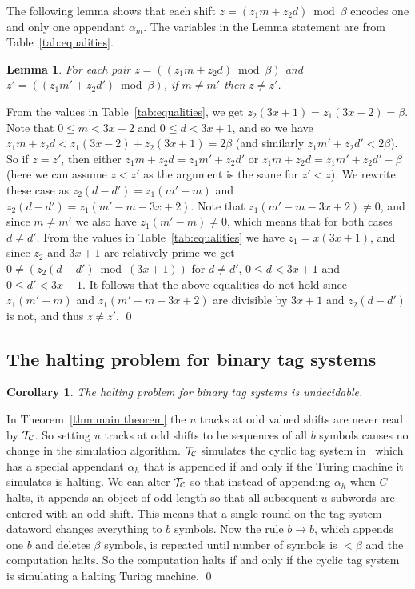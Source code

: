 \documentclass[11pt]{article} \usepackage{amsfonts,amsmath,amssymb,amsthm}
\renewenvironment{proof}{{\bfseries\noindent Proof.}}{\qed\vspace{3.5ex}}
\newtheorem{lemma}{Lemma}
\newtheorem{corollary}{Corollary}
\begin{document}
The following lemma shows that each shift $z=(z_1m+z_2d)\bmod\beta$ encodes one and only one appendant $\alpha_{m}$.
The variables in the Lemma statement are from Table~\ref{tab:equalities}.
\begin{lemma}\label{lem:Encode appendant}
For each pair $z=((z_1m+z_2d)\bmod\beta)$ and $z'=((z_1m'+z_2d')\bmod\beta)$, if $m\neq m'$ then $z\neq z'$.
\end{lemma}
\begin{proof}
From the values in Table~\ref{tab:equalities}, we get $z_2(3x+1)=z_1(3x-2)=\beta$. 
Note that $0\leqslant m< 3x-2$ and $0\leqslant d< 3x+1$,  and so we have $z_1m+z_2d<z_1(3x-2)+z_2(3x+1)=2\beta$ (and similarly  $z_1m'+z_2d'<2\beta$). 
So if $z=z'$, then either $z_1m+z_2d=z_1m'+z_2d'$ or $z_1m+z_2d=z_1m'+z_2d'-\beta$ (here we can assume $z<z'$ as the argument is the same for $z'<z$).
We rewrite these case as $z_2(d-d')=z_1(m'-m)$ and $z_2(d-d')=z_1(m'-m-3x+2)$. 
Note that $z_1(m'-m-3x+2)\neq 0$, and since $m\neq m'$ we also have $z_1(m'-m)\neq 0$, which means that for both cases $d\neq d'$. 
From the values in Table~\ref{tab:equalities} we have $z_1=x(3x+1)$, and since $z_2$ and $3x+1$ are relatively prime we get $0\neq (z_2(d-d')\bmod (3x+1))$ for $d\neq d'$, $0\leqslant d< 3x+1$ and $0\leqslant d'< 3x+1$. It follows that the above equalities do not hold since $z_1(m'-m)$ and $z_1(m'-m-3x+2)$ are divisible by $3x+1$ and $z_2(d-d')$ is not, and thus $z\neq z'$.
\end{proof}


\subsection{The halting problem for binary tag systems}

\begin{corollary}\label{cor:2 symbol tag halting problem}
The halting problem for binary tag systems is undecidable.
\end{corollary}
\begin{proof}
In Theorem~\ref{thm:main theorem} the $u$ tracks at odd valued shifts are never read by $\mathcal{T_{\mathcal{C}}}$. So setting $u$ tracks at odd shifts to be sequences of all $b$ symbols causes no change in the simulation algorithm. $\mathcal{T_{\mathcal{C}}}$ simulates the cyclic tag system in~\cite{NearyWoods2006C} which has a special appendant $\alpha_h$ that is appended if and only if the Turing machine it simulates is halting. 
We can alter $\mathcal{T_{\mathcal{C}}}$ so that instead of appending $\alpha_h$ when $C$ halts, it appends an object of odd length so that all subsequent $u$ subwords are entered with an odd shift. This means that a single round on the tag system dataword changes everything to $b$ symbols. 
Now the rule $b\rightarrow b$, which appends one $b$ and deletes $\beta$ symbols, is repeated until number of symbols is $<\beta$ and the computation halts. So the computation halts if and only if the cyclic tag system is simulating a halting Turing machine.
\end{proof}
\end{document}
